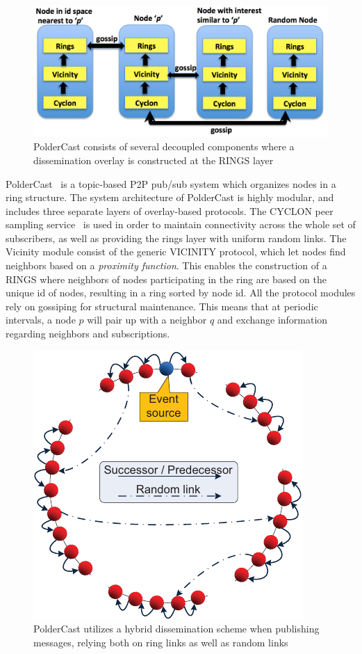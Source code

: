 \begin{figure}[h]
    \centering
\includegraphics[scale=0.4]{img/poldercast_arch.png}
\caption{PolderCast consists of several decoupled components where a
    dissemination overlay is constructed at the RINGS layer}
\end{figure}

PolderCast~\cite{Setty:2012} is a topic-based
P2P pub/sub system which organizes nodes in a ring structure. The system
architecture of PolderCast is highly modular, and includes three
separate layers of overlay-based protocols. The CYCLON peer sampling
service~\cite{Voulgaris:2005} is used in order to maintain connectivity
across the whole set of subscribers, as well as providing the rings
layer with uniform random links. The Vicinity module consist of the
generic VICINITY protocol, which let nodes find neighbors based on a
\emph{proximity function}. This enables the construction of a RINGS
where neighbors of nodes participating in the ring are based on the
unique id of nodes, resulting in a ring sorted by node id. All the
protocol modules rely on gossiping for structural maintenance. This
means that at periodic intervals, a node $p$ will pair up with a
neighbor $q$ and exchange information regarding neighbors and
subscriptions.


\begin{figure}[h]
    \centering
\includegraphics{img/hybrid_dissemination.pdf}
\caption{PolderCast utilizes a hybrid dissemination scheme when
    publishing messages, relying both on ring links as well as random
    links}
\end{figure}

